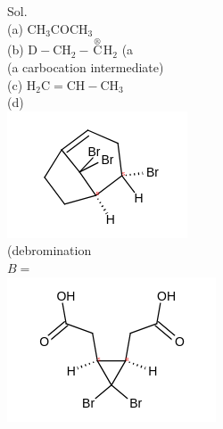 \documentclass[10pt]{article}
\begin{document}
Sol.\\
(a) $\mathrm{CH}_{3} \mathrm{COCH}_{3}$\\
(b) $\mathrm{D}-\mathrm{CH}_{2}-\stackrel{\text { ® }}{\mathrm{C}} \mathrm{H}_{2}$ (a\\
(a carbocation intermediate)\\
(c) $\mathrm{H}_{2} \mathrm{C}=\mathrm{CH}-\mathrm{CH}_{3}$\\
(d)\\
\includegraphics{smile-2d7583bfad94c22ffd816d85433a1f71e89dd7ed}\\
(debromination\\
$B=$\\
\includegraphics{smile-766a7b08e7166e20a7f4d59fd138f00dcfcd1a7a}\\
\end{document}
